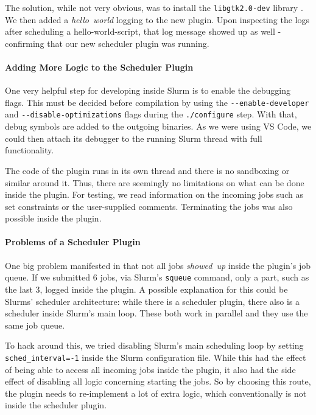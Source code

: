 The solution, while not very obvious, was to install the \verb|libgtk2.0-dev| library .
We then added a \emph{hello~world} logging to the new plugin. Upon inspecting the logs after scheduling a hello-world-script, that log message showed up as well - confirming that our new scheduler plugin was running.

\paragraph{Adding More Logic to the Scheduler Plugin}

One very helpful step for developing inside Slurm is to enable the debugging flags.
This must be decided before compilation by using the \verb|--enable-developer| and \verb|--disable-optimizations| flags during the \verb|./configure| step. 
With that, debug symbols are added to the outgoing binaries. 
As we were using VS Code, we could then attach its debugger to the running Slurm thread with full functionality.

The code of the plugin runs in its own thread and there is no sandboxing or similar around it.
Thus, there are seemingly no limitations on what can be done inside the plugin. 
For testing, we read information on the incoming jobs such as set constraints or the user-supplied comments. Terminating the jobs was also possible inside the plugin.

\paragraph{Problems of a Scheduler Plugin}

One big problem manifested in that not all jobs \emph{showed~up} inside the plugin's job queue. 
If we submitted 6 jobs, via Slurm's \verb|squeue| command, only a part, such as the last 3, logged inside the plugin.
A possible explanation for this could be Slurms' scheduler architecture: while there is a scheduler plugin, there also is a scheduler inside Slurm's main loop. These both work in parallel  and they use the same job queue.

To hack around this, we tried disabling Slurm's main scheduling loop by setting \verb|sched_interval=-1| inside the Slurm configuration file. 
While this had the effect of being able to access all incoming jobs inside the plugin, it also had the side effect of disabling all logic concerning starting the jobs.
So by choosing this route, the plugin needs to re-implement a lot of extra logic, which conventionally is not inside the scheduler plugin. 

